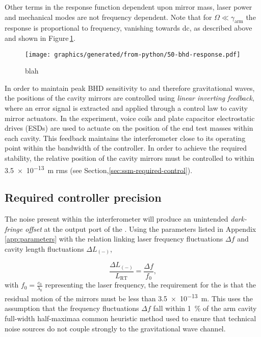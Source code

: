 Other terms in the response function dependent upon mirror mass, laser power and mechanical modes are not frequency dependent. Note that for $\Omega \ll \gamma_{\textrm{arm}}$ the response is proportional to frequency, vanishing towards dc, as described above and shown in Figure\,\ref{fig:bhd-response}.

\begin{figure}
  \centering
  \texttt{[image: graphics/generated/from-python/50-bhd-response.pdf]}
  \caption{\label{fig:bhd-response}blah}
\end{figure}

In order to maintain peak \gls{BHD} sensitivity to \LMINUS{} and therefore gravitational waves, the positions of the cavity mirrors are controlled using \emph{linear inverting feedback}, where an error signal is extracted and applied through a control law to cavity mirror actuators. In the experiment, voice coils and plate capacitor electrostatic drives (\glspl{ESD}) \cite{Wittel2015} are used to actuate on the position of the end test masses within each cavity. This feedback maintains the interferometer close to its operating point within the bandwidth of the controller. In order to achieve the required stability, the relative position of the cavity mirrors must be controlled to within \SI{3.5e-13}{\meter} rms (see Section,\ref{sec:ssm-required-control}).
   

\subsection{\label{sec:ssm-required-control}Required controller precision}

The noise present within the interferometer will produce an unintended \emph{dark-fringe offset} at the output port of the \SSM{}. Using the parameters listed in Appendix\,\ref{app:parameters} with the relation linking laser frequency fluctuations $\Delta f$ and cavity length fluctuations $\Delta L_{\left(-\right)}$,

\begin{equation}
  \frac{\Delta L_{\left(-\right)}}{L_{\textrm{RT}}} = \frac{\Delta f}{f_{0}},
\end{equation}
with $f_{0} = \frac{c_{0}}{\lambda_{0}}$ representing the laser frequency, the requirement for the \SSM{} is that the residual motion of the mirrors must be less than \SI{3.5e-13}{\meter}. This uses the assumption that the frequency fluctuations $\Delta f$ fall within \SI{1}{\percent} of the arm cavity full-width half-maxima\textemdash a common heuristic method used to ensure that technical noise sources do not couple strongly to the gravitational wave channel.

